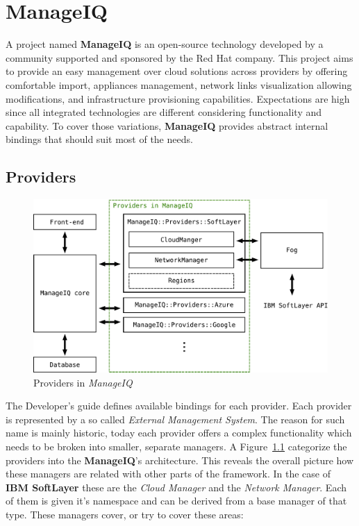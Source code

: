 \chapter{ManageIQ}
\label{chap:ManageIQ}

A project named \textbf{ManageIQ} is an open-source technology developed by a community supported and sponsored by the Red Hat company. This project aims to provide an easy management over cloud solutions across providers by offering comfortable import, appliances management, network links visualization allowing modifications, and infrastructure provisioning capabilities. Expectations are high since all integrated technologies are different considering functionality and capability. To cover those variations, \textbf{ManageIQ} provides abstract internal bindings that should suit most of the needs.

\section{Providers}
\label{sec:Providers}

\begin{figure}[ht!]
	\includegraphics[width=\textwidth]{fig/architecture}
	\caption{Providers in \emph{ManageIQ}}\label{fig:Providers in ManageIQ}
\end{figure}

The Developer's guide\cite{manageiq_dev} defines available bindings for each provider. Each provider is represented by a so called \emph{External Management System}. The reason for such name is mainly historic, today each provider offers a complex functionality which needs to be broken into smaller, separate managers. A Figure~\ref{fig:Providers in ManageIQ}  categorize the providers into the \textbf{ManageIQ}'s architecture. This reveals the overall picture how these managers are related with other parts of the framework. In the case of \textbf{IBM SoftLayer} these are the \emph{Cloud Manager} and the \emph{Network Manager}. Each of them is given it's namespace and can be derived from a base manager of that type. These managers cover, or try to cover these areas:

